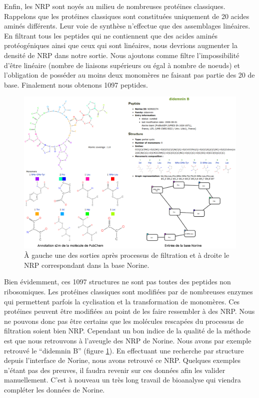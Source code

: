 Enfin, les NRP sont noyés au milieu de nombreuses protéines classiques.
Rappelons que les protéines classiques sont constituées uniquement de 20 acides aminés différents.
Leur voie de synthèse n'effectue que des assemblages linéaires.
En filtrant tous les peptides qui ne contiennent que des acides aminés protéogéniques ainsi que ceux qui sont linéaires, nous devrions augmenter la densité de NRP dans notre sortie.
Nous ajoutons comme filtre l'impossibilité d'être linéaire (nombre de liaisons supérieurs ou égal à nombre de noeuds) et l'obligation de posséder au moins deux monomères ne faisant pas partie des 20 de base.
Finalement nous obtenons 1097 peptides.

\begin{figure}[h!]
  \begin{center}
    \includegraphics[width=450px]{Figures/contributions/didemnin_B.png}
    \caption{\label{didemin}À gauche une des sorties après processus de filtration et à droite le NRP correspondant dans la base Norine.}
  \end{center}
\end{figure}

Bien évidemment, ces 1097 structures ne sont pas toutes des peptides non ribosomiques.
Les protéines classiques sont modifiées par de nombreuses enzymes qui permettent parfois la cyclisation et la transformation de monomères.
Ces protéines peuvent être modifiées au point de les faire ressembler à des NRP.
Nous ne pouvons donc pas être certains que les molécules rescapées du processus de filtration soient bien NRP.
Cependant un bon indice de la qualité de la méthode est que nous retrouvons à l'aveugle des NRP de Norine.
Nous avons par exemple retrouvé le ``didemnin B'' (figure \ref{didemin}).
En effectuant une recherche par structure depuis l'interface de Norine, nous avons retrouvé ce NRP.
Quelques exemples n'étant pas des preuves, il faudra revenir sur ces données afin les valider manuellement.
C'est à nouveau un très long travail de bioanalyse qui viendra compléter les données de Norine.




